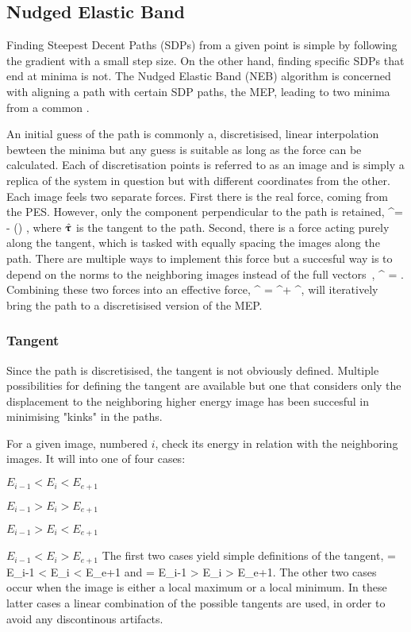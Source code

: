 \subsection{Nudged Elastic Band}
\label{sec:neb}

Finding Steepest Decent Paths (SDPs) from a given point is simple by following the gradient with a small step size.
On the other hand, finding specific SDPs that end at minima is not.
The Nudged Elastic Band (NEB) algorithm is concerned with aligning a path with certain SDP paths, the MEP, leading to two minima from a common .

An initial guess of the path is commonly a, discretisised, linear interpolation bewteen the minima but any guess is suitable as long as the force can be calculated.
Each of discretisation points is referred to as an image and is simply a replica of the system in question but with different coordinates from the other.
Each image feels two separate forces.
First there is the real force, coming from the PES.
However, only the component perpendicular to the path is retained,
\vF^\perp = \vF - (\vF \cdot \uvt) \uvt,
\eeq
where $\hat{{\mathrm{\mathbf{\bm{\uptau}}}}}$ is the tangent to the path.
Second, there is a force acting purely along the tangent, which is tasked with equally spacing the images along the path.
There are multiple ways to implement this force but a succesful way is to depend on the norms to the neighboring images instead of the full vectors~\cite{neb-tangent-2000},
\vF^ = \text{\missing}.
\eeq
Combining these two forces into an effective force,
\vF^ = \vF^\perp + \vF^,
\eeq
will iteratively bring the path to a discretisised version of the MEP.

\subsubsection{Tangent}

Since the path is discretisised, the tangent is not obviously defined.
Multiple possibilities for defining the tangent are available but one that considers only the displacement to the neighboring higher energy image has been succesful in minimising "kinks" in the paths.~\cite{neb-tangent-2000}

For a given image, numbered $i$, check its energy in relation with the neighboring images.
It will into one of four cases:
\item $E_{i-1} < E_i < E_{e+1}$
\item $E_{i-1} > E_i > E_{e+1}$
\item $E_{i-1} > E_i < E_{e+1}$
\item $E_{i-1} < E_i > E_{e+1}$
\een
The first two cases yield simple definitions of the tangent,
\uvt = \missing \quad {} \quad E_{i-1} < E_i < E_{e+1}
\eeq
and
\uvt = \missing \quad {} \quad E_{i-1} > E_i > E_{e+1}.
\eeq
The other two cases occur when the image is either a local maximum or a local minimum.
In these latter cases a linear combination of the possible tangents are used, in order to avoid any discontinous artifacts.


